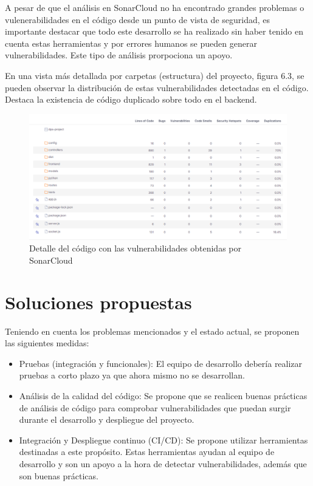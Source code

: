 A pesar de que el análisis en SonarCloud no ha encontrado grandes problemas o vulenerabilidades en el código desde un punto de vista de seguridad, es importante destacar que todo este desarrollo se ha realizado sin haber tenido en cuenta estas herramientas y por errores humanos se pueden generar vulnerabilidades. Este tipo de análisis prorpociona un apoyo.

En una vista más detallada por carpetas (estructura) del proyecto, figura 6.3, se pueden observar la distribución de estas vulnerabilidades detectadas en el código. Destaca la existencia de código duplicado sobre todo en el backend.

\newpage

\begin{figure}[h]
\includegraphics[width=\textwidth]{figures/Code-issues.png}
\caption{Detalle del código con las vulnerabilidades obtenidas por SonarCloud}
\label{fig:esquema}
\end{figure}







\section{Soluciones propuestas}

Teniendo en cuenta los problemas mencionados y el estado actual, se proponen las siguientes medidas:

\begin{itemize}
    \item Pruebas (integración y funcionales): El equipo de desarrollo debería realizar pruebas a corto plazo ya que ahora mismo no se desarrollan.
    \item Análisis de la calidad del código: Se propone que se realicen buenas prácticas de análisis de código para comprobar vulnerabilidades que puedan surgir durante el desarrollo y despliegue del proyecto. 
    \item Integración y Despliegue continuo (CI/CD): Se propone utilizar herramientas destinadas a este propósito. Estas herramientas ayudan al equipo de desarrollo y son un apoyo a la hora de detectar vulnerabilidades, además que son buenas prácticas.
    
\end{itemize}